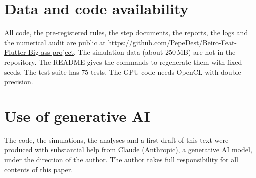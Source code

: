 \documentclass[11pt]{article}
\begin{document}
\section*{Data and code availability}
All code, the pre-registered rules, the step documents, the reports, the logs and the numerical audit are public at
\url{https://github.com/PepeDest/Beiro-Feat-Flutter-Big-ass-project}. The simulation data (about 250\,MB) are not in the
repository. The README gives the commands to regenerate them with fixed seeds. The test suite has 75 tests. The GPU code
needs OpenCL with double precision.

\section*{Use of generative AI}
The code, the simulations, the analyses and a first draft of this text were produced with substantial help from Claude
(Anthropic), a generative AI model, under the direction of the author. The author takes full responsibility for all contents of this paper.



\end{document}
